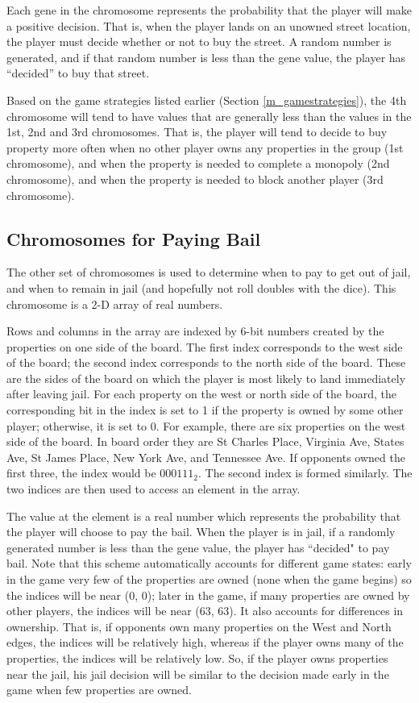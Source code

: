 Each gene in the chromosome represents the probability that the player will make
a positive decision. That is, when the player lands on an unowned street
location, the player must decide whether or not to buy the street. A random
number is generated, and if that random number is less than the gene value, the
player has ``decided'' to buy that street.

Based on the game strategies listed earlier (Section \ref{m_gamestrategies}),
the 4th chromosome will tend to have values that are generally less than the
values in the 1st, 2nd and 3rd chromosomes. That is, the player will tend to
decide to buy property more often when no other player owns any properties in
the group (1st chromosome), and when the property is needed to complete a
monopoly (2nd chromosome), and when the property is needed to block another
player (3rd chromosome).

\subsection{Chromosomes for Paying Bail}

The other set of chromosomes is used to determine when to pay to get out of
jail, and when to remain in jail (and hopefully not roll doubles with the dice).
This chromosome is a 2-D array of real numbers.

Rows and columns in the array are indexed by 6-bit numbers created by the
properties on one side of the board. The first index corresponds to the west
side of the board; the second index corresponds to the north side of the board.
These are the sides of the board on which the player is most likely to land
immediately after leaving jail. For each property on the west or north side of
the board, the corresponding bit in the index is set to 1 if the property is
owned by some other player; otherwise, it is set to 0. For example, there are
six properties on the west side of the board. In board order they are St Charles
Place, Virginia Ave, States Ave, St James Place, New York Ave, and Tennessee
Ave. If opponents owned the first three, the index would be $000111_2$. The
second index is formed similarly. The two indices are then used to access an
element in the array.

The value at the element is a real number which represents the probability that
the player will choose to pay the bail. When the player is in jail, if a
randomly generated number is less than the gene value, the player has ``decided"
to pay bail. Note that this scheme automatically accounts for different game
states:
early in the game very few of the properties are owned (none when the game
begins) so the indices will be near (0, 0); later in the game, if many
properties are owned by other players, the indices will be near (63, 63). It
also accounts for differences in ownership. That is, if opponents own many
properties on the West and North edges, the indices will be relatively high,
whereas if the player owns many of the properties, the indices will be
relatively low. So, if the player owns properties near the jail, his jail
decision will be similar to the decision made early in the game when few
properties are owned.

